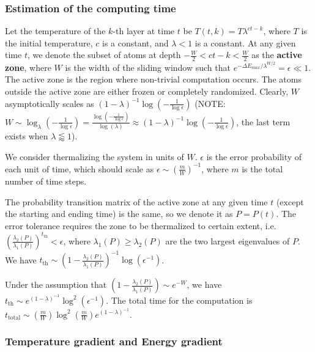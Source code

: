 \documentclass[twocolumn,superscriptaddress,english,showpacs,longbibliography]{revtex4-2}
\begin{document}
\subsubsection{Estimation of the computing time}\label{estimation-of-the-computing-time}

Let the temperature of the $k$-th layer at time $t$ be
$T(t, k) = T \lambda^{ct - k}$, where $T$ is the initial
temperature, $c$ is a constant, and $\lambda < 1$ is a constant. At
any given time $t$, we denote the subset of atoms at depth
$-\frac{W}{2} < ct - k < \frac{W}{2}$ as the \textbf{active zone},
where $W$ is the width of the sliding window such that
$e^{-\Delta E_{max} /\lambda^{W/2}} = \epsilon \ll 1$. The active zone
is the region where non-trivial computation occurs. The atoms outside
the active zone are either frozen or completely randomized. Clearly,
$W$ asymptotically scales as
$(1-\lambda)^{-1} \log(-\frac{1}{\log\epsilon})$
(NOTE:$W \sim \log_{\lambda}(-\frac{1}{\log{\epsilon}}) = \frac{\log(-\frac{1}{\log{\epsilon}})}{\log(\lambda)} \approx (1 - \lambda)^{-1}\log(-\frac{1}{\log \epsilon})$,
the last term exists when $\lambda \lessapprox 1$).

We consider thermalizing the system in units of $W$. $\epsilon$ is
the error probability of each unit of time, which should scale as
$\epsilon \sim\left(\frac{m}{W}\right)^{-1}$, where $m$ is the total
number of time steps.

The probability transition matrix of the active zone at any given time
$t$ (except the starting and ending time) is the same, so we denote it
as $P = P(t)$. The error tolerance requires the zone to be thermalized
to certain extent,
i.e.~$\left(\frac{\lambda_2(P)}{\lambda_1(P)}\right)^{t_{\text{th}}} < \epsilon$,
where $\lambda_1(P) \geq \lambda_2(P)$ are the two largest eigenvalues
of $P$. We have
$t_{\text{th}} \sim \left(1-\frac{\lambda_2(P)}{\lambda_1(P)}\right)^{-1}\log(\epsilon^{-1})$.

Under the assumption that
$\left(1-\frac{\lambda_2(P)}{\lambda_1(P)}\right)\sim e^{-W}$, we have
$t_{\text{th}} \sim e^{(1-\lambda)^{-1}}\log^2(\epsilon^{-1})$. The
total time for the computation is
$t_{\text{total}} \sim \left(\frac{m}{W}\right)\log^2(\frac{m}{W}) e^{(1-\lambda)^{-1}}$.

\subsubsection{Temperature gradient and Energy
gradient}\label{temperature-gradient-and-energy-gradient}
\end{document}
